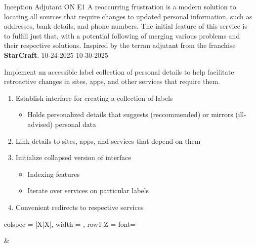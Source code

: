 \documentclass[7px]{article}
\begin{document}
\frontmatter
{Inception}
{Adjutant}
{ON}
{E1}
{A reoccurring frustration is a modern solution to locating all sources that require changes to updated personal information, such as addresses, bank details, and phone numbers. The initial feature of this service is to fulfill just that, with a potential following of merging various problems and their respective solutions. Inspired by the terran adjutant from the franchise \textbf{StarCraft}.}
{10-24-2025}
{10-30-2025}

\strategy
{Implement an accessible label collection of personal details to help facilitate retroactive changes in sites, apps, and other services that require them.}
{
  \begin{enumerate}
    \item Establish interface for creating a collection of labels
      \begin{itemize}[label=$\multimapdotinv$, leftmargin=3mm]
        \item Holds personalized details that suggests (reccommended) or mirrors (ill-advised) personal data
      \end{itemize}
    \item Link details to sites, apps, and services that depend on them
    \item Initialize collapsed version of interface
      \begin{itemize}[label=$\multimapdotinv$, leftmargin=3mm]
        \item Indexing features
        \item Iterate over services on particular labels
      \end{itemize}
    \item Convenient redirects to respective services
    \end{enumerate}
}
{
  \begin{itemize}[label=\textsection]
  \end{itemize}
}
{
  \raggedright
  \begin{itemize}[label=\blitzb]
  \end{itemize}
}

\deploy
{
  \begin{itemize}
  \end{itemize}
}
{
 \raggedright
  \begin{tblr}{
      colspec = {|X|X|}, width = \linewidth,
      row{1-Z} = {font=\scriptsize}
    }
    {
      \begin{minipage}[t]{\linewidth}
        \vspace{-2.3em}
        \begin{enumerate}
        \end{enumerate}
      \end{minipage}
    } & {
      \begin{minipage}[t]{\linewidth}
        \vspace{-2.3em}
        \begin{enumerate}
        \end{enumerate}
      \end{minipage}
    } \\
  \end{tblr}
}
\end{document}
